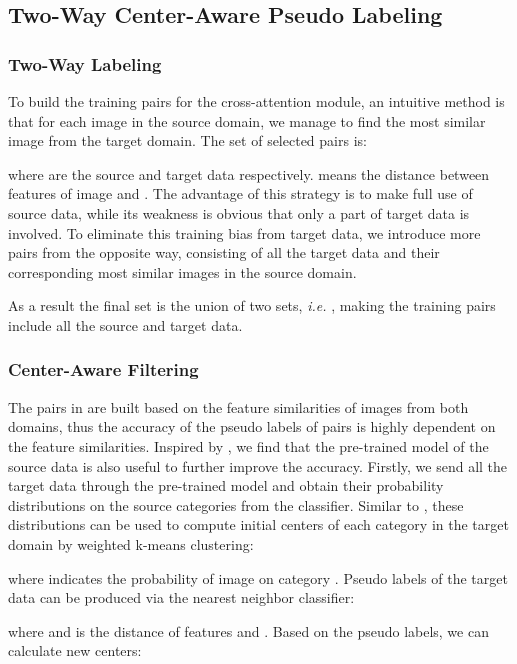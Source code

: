 \documentclass[dvipsnames, svgnames, x11names, table]{article} \usepackage{iclr2022_conference,times}
\begin{document}
\begin{spacing}{1.0}
\subsection{Two-Way Center-Aware Pseudo Labeling}
\label{ssec:pseudolabels}



\subsubsection{Two-Way Labeling}

To build the training pairs for the cross-attention module, an intuitive method is that for each image in the source domain, we manage to find the most similar image from the target domain. The set  of selected pairs is:

where  are the source and target data respectively.  means the distance between features of image  and . The advantage of this strategy is to make full use of source data, while its weakness is obvious that only a part of target data is involved. To eliminate this training bias from target data, we introduce more pairs  from the opposite way, consisting of all the target data and their corresponding most similar 
images in the source domain.

As a result the final set  is the union of two sets, \textit{i.e.} , making the training pairs include all the source and target data.

\subsubsection{Center-Aware Filtering}
The pairs in  are built based on the feature similarities of images from both domains, thus the accuracy of the pseudo labels of pairs is highly dependent on the feature similarities. Inspired by \citet{liang2020we}, we find that the pre-trained model of the source data is also useful to further improve the accuracy.
Firstly, we send all the target data through the pre-trained model and obtain their probability distributions  on the source categories from the classifier. Similar to \citet{liang2020we}, these distributions can be used to compute initial centers of each category in the target domain by weighted k-means clustering:

where  indicates the probability of image  on category . Pseudo labels of the target data can be produced via the nearest neighbor classifier:

where  and  is the distance of features  and . Based on the pseudo labels, we can calculate new centers:



\end{spacing}
\end{document}
